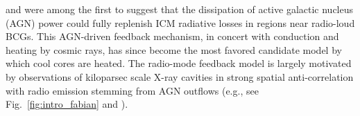  
\citet{rosner89} and  \citet{baum91} were  among the first  to suggest
that  the dissipation  of active  galactic nucleus  (AGN)  power could
fully  replenish  ICM  radiative  losses in  regions  near  radio-loud
BCGs. This  AGN-driven feedback mechanism, in  concert with conduction
and  heating  by  cosmic  rays,  has since  become  the  most  favored
candidate  model  by  which  cool  cores are  heated.  The  radio-mode
feedback  model is  largely  motivated by  observations of  kiloparsec
scale  X-ray cavities  in strong  spatial anti-correlation  with radio
emission          stemming          from         AGN          outflows
(e.g., see Fig.~\ref{fig:intro_fabian} and \citealt{boehringer93,fabian00,fabian06,churazov01,mcnamara00,mcnamara01,blanton01,nulsen05,forman05,forman07,birzan04}).




